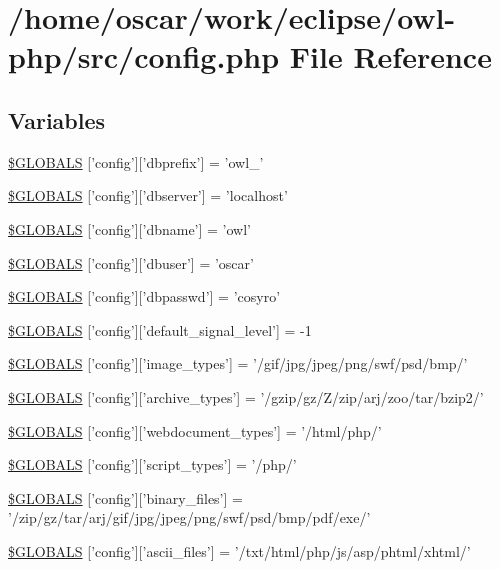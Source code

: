 \hypertarget{config_8php}{
\section{/home/oscar/work/eclipse/owl-php/src/config.php File Reference}
\label{config_8php}
}
\subsection*{Variables}
\begin{CompactItemize}
\item 
\hyperlink{config_8php_649654c29dcea71eb7da0541b4458b41}{\$GLOBALS} \mbox{[}'config'\mbox{]}\mbox{[}'dbprefix'\mbox{]} = 'owl\_\-'
\item 
\hyperlink{config_8php_bb3d30de18f7004caa11db993e7acc2d}{\$GLOBALS} \mbox{[}'config'\mbox{]}\mbox{[}'dbserver'\mbox{]} = 'localhost'
\item 
\hyperlink{config_8php_91c6a49f3dd2b8b0e6955cf2cf22d728}{\$GLOBALS} \mbox{[}'config'\mbox{]}\mbox{[}'dbname'\mbox{]} = 'owl'
\item 
\hyperlink{config_8php_c72170ea71ebed873ef2e3428dc68944}{\$GLOBALS} \mbox{[}'config'\mbox{]}\mbox{[}'dbuser'\mbox{]} = 'oscar'
\item 
\hyperlink{config_8php_78cd1155d12fb4bc06bf1e6f3ef9cce8}{\$GLOBALS} \mbox{[}'config'\mbox{]}\mbox{[}'dbpasswd'\mbox{]} = 'cosyro'
\item 
\hyperlink{config_8php_a6cb37c985e2e9c87e33663f4597fe26}{\$GLOBALS} \mbox{[}'config'\mbox{]}\mbox{[}'default\_\-signal\_\-level'\mbox{]} = -1
\item 
\hyperlink{config_8php_335a0ed5b0fc63ef47f9ba1d91e41dc6}{\$GLOBALS} \mbox{[}'config'\mbox{]}\mbox{[}'image\_\-types'\mbox{]} = '/gif/jpg/jpeg/png/swf/psd/bmp/'
\item 
\hyperlink{config_8php_93b1c5faba6a6e120b07b4206a619144}{\$GLOBALS} \mbox{[}'config'\mbox{]}\mbox{[}'archive\_\-types'\mbox{]} = '/gzip/gz/Z/zip/arj/zoo/tar/bzip2/'
\item 
\hyperlink{config_8php_bf54039b81f6214bcc39d4f399ad068f}{\$GLOBALS} \mbox{[}'config'\mbox{]}\mbox{[}'webdocument\_\-types'\mbox{]} = '/html/php/'
\item 
\hyperlink{config_8php_c4d548310cf87788e37150caed7d4092}{\$GLOBALS} \mbox{[}'config'\mbox{]}\mbox{[}'script\_\-types'\mbox{]} = '/php/'
\item 
\hyperlink{config_8php_0192eb81e0d90debab674415130b0884}{\$GLOBALS} \mbox{[}'config'\mbox{]}\mbox{[}'binary\_\-files'\mbox{]} = '/zip/gz/tar/arj/gif/jpg/jpeg/png/swf/psd/bmp/pdf/exe/'
\item 
\hyperlink{config_8php_feeb257c3edcf45093f5ffaccc3b8ee0}{\$GLOBALS} \mbox{[}'config'\mbox{]}\mbox{[}'ascii\_\-files'\mbox{]} = '/txt/html/php/js/asp/phtml/xhtml/'
\end{CompactItemize}


